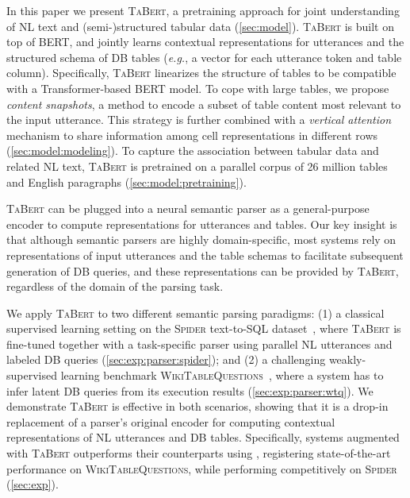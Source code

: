 \documentclass[11pt,a4paper]{article}
\def\model/{\textsc{TaBert}}
\def\bert/{}
\newcommand{\eg}{\hbox{\emph{e.g.}}\xspace}
\def\wtq/{\textsc{WikiTableQuestions}}
\def\spider/{\textsc{Spider}}
\begin{document}
In this paper we present \model/, a pretraining approach for joint understanding of NL text and (semi-)structured tabular data (\autoref{sec:model}).
\model/ is built on top of BERT,
and jointly learns contextual representations for utterances and the structured schema of DB tables (\eg, a vector for each utterance token and table column).
Specifically, \model/ linearizes the structure of tables to be compatible with a Transformer-based BERT model. 
To cope with large tables, we propose \emph{content snapshots}, a method to encode a subset of table content most relevant to the input utterance.
This strategy is further combined with a \emph{vertical attention} mechanism to share information among cell representations in different rows (\autoref{sec:model:modeling}). 
To capture the association between tabular data and related NL text, \model/ is pretrained on a parallel corpus of 26 million tables and English paragraphs (\autoref{sec:model:pretraining}).




\model/ can be plugged into a neural semantic parser as a general-purpose encoder to compute representations for utterances and tables.
Our key insight is that although semantic parsers are highly domain-specific, most systems rely on representations of input utterances and the table schemas to facilitate subsequent generation of DB queries, and these representations can be provided by \model/, regardless of the domain of the parsing task.

We apply \model/ to two different semantic parsing paradigms: 
(1) a classical supervised learning setting on the \spider/ text-to-SQL dataset~\citep{Yu2018SpiderAL}, where \model/ is fine-tuned together with a task-specific parser using parallel NL utterances and labeled DB queries (\autoref{sec:exp:parser:spider});
and (2) a challenging weakly-supervised learning benchmark \wtq/~\citep{pasupat2015compositional}, where 
a system has to infer latent DB queries from its execution results (\autoref{sec:exp:parser:wtq}).
We demonstrate \model/ is effective in both scenarios, showing that it is a drop-in replacement of a parser's original encoder for computing contextual representations of NL utterances and DB tables.
Specifically, systems augmented with \model/ outperforms their counterparts using \bert/, registering state-of-the-art performance on \wtq/, while performing competitively on \spider/ (\autoref{sec:exp}).
\end{document}
